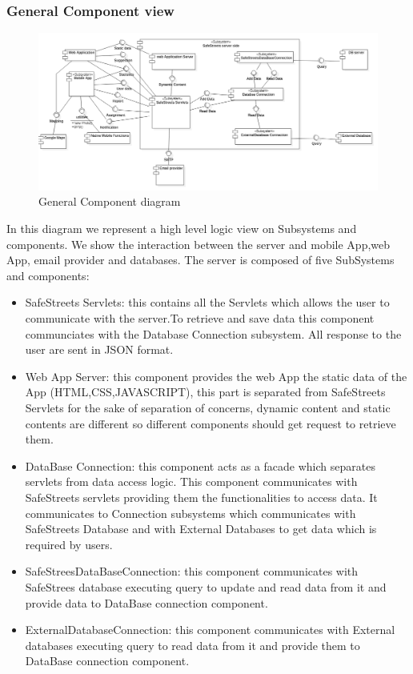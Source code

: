 \subsubsection{General Component view}
\begin{figure}[H]
\centering
\includegraphics[width=\textwidth]{Images/GenericComponentDiagram.png}
\caption{\label{fig:ComWI}General Component diagram}
\end{figure}
In this diagram we represent a high level logic view on Subsystems and components. We show the interaction between the server and mobile App,web App, email provider and databases.
The server is composed of five SubSystems and components:
\begin{itemize}
\item SafeStreets Servlets: this contains all the Servlets which allows the user to communicate with the server.To retrieve and save data this component communciates with the Database Connection subsystem. All response to the user are sent in JSON format. 
\item Web App Server: this component provides the web App the static data of the App (HTML,CSS,JAVASCRIPT), this part is separated from SafeStreets Servlets for the sake of separation of concerns, dynamic content and static contents are different so different components should get request to retrieve them.
\item DataBase Connection: this component acts as a facade which separates servlets from data access logic. This component communicates with SafeStreets servlets providing them the functionalities to access data.
It communicates to Connection subsystems which communicates with SafeStreets Database and with External Databases to get data which is required by users.
\item SafeStreesDataBaseConnection: this component communicates with SafeStrees database executing query to update and read data from it and provide data to DataBase connection component. 
\item ExternalDatabaseConnection: this component communicates with External databases executing query to read data from it and provide them to DataBase connection component.
\end{itemize}
